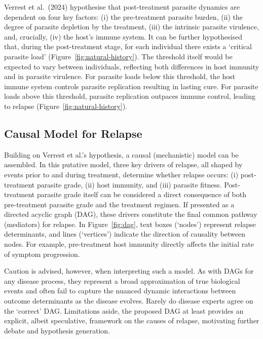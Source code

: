 Verrest et al.\ (2024)\cite{verrest2024} hypothesise that post-treatment parasite dynamics are dependent on four key factors: (i) the pre-treatment parasite burden, (ii) the degree of parasite depletion by the treatment, (iii) the intrinsic parasite virulence, and, crucially, (iv) the host's immune system. It can be further hypothesised that, during the post-treatment stage, for each individual there exists a `critical parasite load' (Figure~\ref{fig:natural-history}). The threshold itself would be expected to vary between individuals, reflecting both differences in host immunity and in parasite virulence. For parasite loads below this threshold, the host immune system controls parasite replication resulting in lasting cure. For parasite loads above this threshold, parasite replication outpaces immune control, leading to relapse (Figure~\ref{fig:natural-history}).

\subsection{Causal Model for Relapse\label{sec:causal_model}}

Building on Verrest et al.'s hypothesis, a causal (mechanistic) model can be assembled. In this putative model, three key drivers of relapse, all shaped by events prior to and during treatment, determine whether relapse occurs: (i) post-treatment parasite grade, (ii) host immunity, and (iii) parasite fitness. Post-treatment parasite grade itself can be considered a direct consequence of both pre-treatment parasite grade and the treatment regimen. If presented as a directed acyclic graph (DAG), these drivers constitute the final common pathway (mediators) for relapse. In Figure~\ref{fig:dag}, text boxes (`nodes') represent relapse determinants, and lines (`vertices') indicate the direction of causality between nodes. For example, pre-treatment host immunity directly affects the initial rate of symptom progression.

Caution is advised, however, when interpreting such a model. As with DAGs for any disease process, they represent a broad approximation of true biological events and often fail to capture the nuanced dynamic interactions between outcome determinants as the disease evolves. Rarely do disease experts agree on the `correct' DAG\cite{daveysmith2016}. Limitations aside, the proposed DAG at least provides an explicit, albeit speculative, framework on the causes of relapse, motivating further debate and hypothesis generation.

